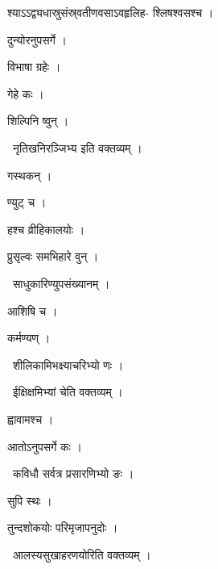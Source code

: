 \documentclass[10pt, openany, oneside]{book}
\begin{document}
\noindent श्याऽऽद्व्यधास्रुसंस्र्वतीणवसाऽवहृलिह- श्लिषश्वसश्च ।

\noindent दुन्योरनुपसर्गे ।

\noindent विभाषा ग्रहेः ।

\noindent गेहे कः ।

\noindent शिल्पिनि ष्वुन् ।

\par\noindent\hspace{1.5em}{\vps वा॰}~{\qt नृतिखनिरञ्जिभ्य इति वक्तव्यम् ।}

\noindent गस्थकन् ।

\noindent ण्युट् च ।

\noindent हश्च व्रीहिकालयोः ।

\noindent प्रुसृल्वः समभिहारे वुन् ।

\par\noindent\hspace{1.5em}{\vps वा॰}~{\qt साधुकारिण्युपसंख्यानम् ।}

\noindent आशिषि च ।

\noindent कर्मण्यण् ।

\par\noindent\hspace{1.5em}{\vps वा॰}~{\qt शीलिकामिभक्ष्याचरिभ्यो णः ।}

\par\noindent\hspace{1.5em}{\vps वा॰}~{\qt ईक्षिक्षमिभ्यां चेति वक्तव्यम् ।}

\noindent ह्वावामश्च ।

\noindent आतोऽनुपसर्गे कः ।

\par\noindent\hspace{1.5em}{\vps वा॰}~{\qt कविधौ सर्वत्र प्रसारणिभ्यो ङः ।}

\noindent सुपि स्थः ।

\noindent तुन्दशोकयोः परिमृजापनुदोः ।

\par\noindent\hspace{1.5em}{\vps वा॰}~{\qt आलस्यसुखाहरणयोरिति वक्तव्यम् ।}
\end{document}
